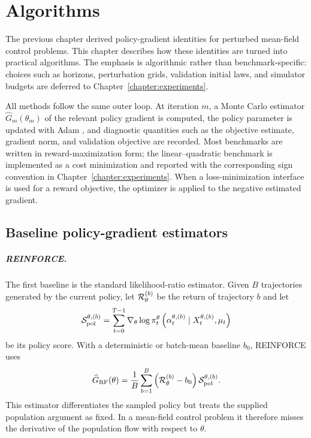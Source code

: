\chapter{Algorithms}
\label{chapter:algorithms}

The previous chapter derived policy-gradient identities for perturbed mean-field control problems. This chapter describes how these identities are turned into practical algorithms. The emphasis is algorithmic rather than benchmark-specific: choices such as horizons, perturbation grids, validation initial laws, and simulator budgets are deferred to Chapter~\ref{chapter:experiments}.

All methods follow the same outer loop. At iteration $m$, a Monte Carlo estimator $\widehat G_m(\theta_m)$ of the relevant policy gradient is computed, the policy parameter is updated with Adam \cite{kingma2014adam}, and diagnostic quantities such as the objective estimate, gradient norm, and validation objective are recorded. Most benchmarks are written in reward-maximization form; the linear--quadratic benchmark is implemented as a cost minimization and reported with the corresponding sign convention in Chapter~\ref{chapter:experiments}. When a loss-minimization interface is used for a reward objective, the optimizer is applied to the negative estimated gradient.

\section{Baseline policy-gradient estimators}

\paragraph{REINFORCE.}
The first baseline is the standard likelihood-ratio estimator. Given $B$ trajectories generated by the current policy, let ${\cal R}_\theta^{(b)}$ be the return of trajectory $b$ and let
\begin{align}
    {\cal S}_\mathrm{pol}^{\theta,(b)}
    =
    \sum_{t=0}^{T-1}
    \nabla_\theta
    \log
    \pi_t^\theta
    \left(
        \alpha_t^{\theta,(b)}
        \mid
        X_t^{\theta,(b)},\mu_t
    \right)
\end{align}
be its policy score. With a deterministic or batch-mean baseline $b_0$, REINFORCE uses
\begin{align}
    \widehat G_{\mathrm{RF}}(\theta)
    =
    \frac1B
    \sum_{b=1}^B
    \left(
        {\cal R}_\theta^{(b)}-b_0
    \right)
    {\cal S}_\mathrm{pol}^{\theta,(b)}.
\end{align}
This estimator differentiates the sampled policy but treats the supplied population argument as fixed. In a mean-field control problem it therefore misses the derivative of the population flow with respect to $\theta$.


